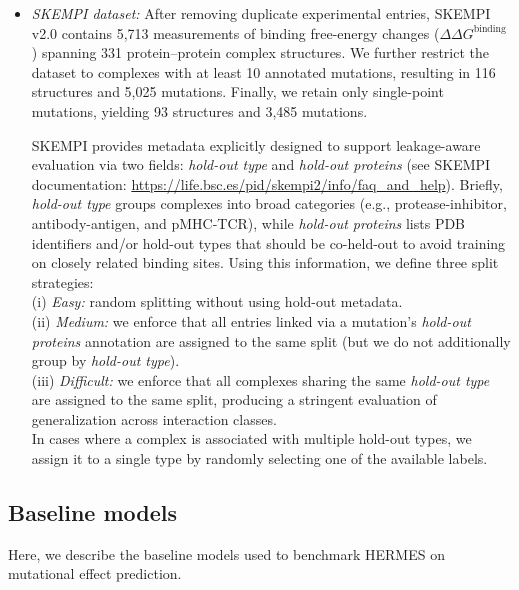 \begin{itemize} 
\item{\em SKEMPI dataset:}
After removing duplicate experimental entries, SKEMPI v2.0 contains 5,713 measurements of binding
free-energy changes ($\Delta\Delta G^{\text{binding}}$) spanning 331 protein–protein complex
structures. We further restrict the dataset to complexes with at least 10 annotated mutations,
resulting in 116 structures and 5,025 mutations. Finally, we retain only single-point mutations,
yielding 93 structures and 3,485 mutations.

SKEMPI provides metadata explicitly designed to support leakage-aware evaluation via two fields:
\emph{hold-out type} and \emph{hold-out proteins} (see SKEMPI documentation:
\url{https://life.bsc.es/pid/skempi2/info/faq_and_help}). Briefly, {\em hold-out type} groups
complexes into broad categories (e.g., protease-inhibitor, antibody-antigen, and pMHC-TCR), while
{\em hold-out proteins} lists PDB identifiers and/or hold-out types that should be co-held-out to
avoid training on closely related binding sites. Using this information, we define three split
strategies:\\


(i) \textit{Easy:} random splitting without using hold-out metadata.\\

(ii) \textit{Medium:} we enforce that all entries linked via a mutation's \emph{hold-out proteins}
annotation are assigned to the same split (but we do not additionally group by \emph{hold-out
type}).\\

(iii) \textit{Difficult:} we enforce that all complexes sharing the same \emph{hold-out type} are
assigned to the same split, producing a stringent evaluation of generalization across interaction
classes.\\

In cases where a complex is associated with multiple hold-out types, we assign it to a single type
by randomly selecting one of the available labels.

\end{itemize}

\subsection{Baseline models}
Here, we describe the baseline models used to benchmark HERMES on mutational effect prediction.\\

